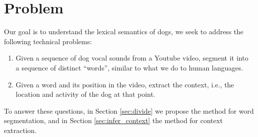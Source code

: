 \section{Problem}
\label{sec:problem}
Our goal is to understand the lexical semantics of dogs, 
we seek to address the following technical problems: 
\begin{enumerate}
	\item Given a sequence of dog vocal sounds from a Youtube video, 
	segment it into a sequence of distinct ``words'', similar to what we 
	do to human languages. 
	\item Given a word and its position in the video, extract the context, i.e.,
	the location and activity of the dog at that point.
\end{enumerate}

To answer these questions, in Section \ref{sec:divide} we propose the method for word segmentation, and in Section \ref{sec:infer_context} the method for context extraction.


